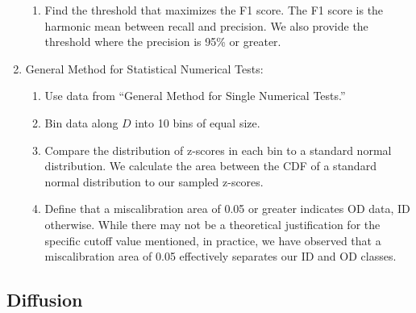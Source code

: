 \begin{enumerate}
\begin{enumerate}
        \item Find the threshold that maximizes the F1 score. The F1 score is the harmonic mean between recall and precision. We also provide the threshold where the precision is 95\% or greater.
    \end{enumerate}

    \item General Method for Statistical Numerical Tests:

    \begin{enumerate}
        \item Use data from ``General Method for Single Numerical Tests.''
        \item Bin data along $D$ into 10 bins of equal size.
        \item Compare the distribution of z-scores in each bin to a standard normal distribution. We calculate the area between the CDF of a standard normal distribution to our sampled z-scores.
        \item Define that a miscalibration area of 0.05 or greater indicates OD data, ID otherwise. While there may not be a theoretical justification for the specific cutoff value mentioned, in practice, we have observed that a miscalibration area of 0.05 effectively separates our ID and OD classes.
    \end{enumerate}
    
\end{enumerate}

\subsection{Diffusion}

